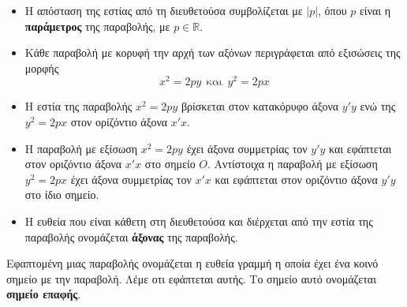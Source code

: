 \documentclass[twoside,nofonts,internet,shmeiwseis]{thewria}
\begin{document}
\begin{itemize}
\item Η απόσταση της εστίας από τη διευθετούσα συμβολίζεται με $ |p| $, όπου $ p $ είναι η \textbf{παράμετρος} της παραβολής, με $ p\in\mathbb{R} $.
\item Κάθε παραβολή με κορυφή την αρχή των αξόνων περιγράφεται από εξισώσεις της μορφής \[ x^2=2py\ \ \textrm{και}\ \  y^2=2px \]
\item Η εστία της παραβολής $ x^2=2py $ βρίσκεται στον κατακόρυφο άξονα $ y'y $ ενώ της $ y^2=2px $ στον ορίζόντιο άξονα $ x'x $.
\item Η παραβολή με εξίσωση $ x^2=2py $ έχει άξονα συμμετρίας τον $ y'y $ και εφάπτεται στον οριζόντιο άξονα $ x'x $ στο σημείο $ O $. Αντίστοιχα η παραβολή με εξίσωση $ y^2=2px $ έχει άξονα συμμετρίας τον $ x'x $ και εφάπτεται στον οριζόντιο άξονα $ y'y $ στο ίδιο σημείο.
\item Η ευθεία που είναι κάθετη στη διευθετούσα και διέρχεται από την εστία της παραβολής ονομάζεται \textbf{άξονας} της παραβολής.
\end{itemize}
Εφαπτομένη μιας παραβολής ονομάζεται η ευθεία γραμμή η οποία έχει ένα κοινό σημείο με την παραβολή. Λέμε οτι εφάπτεται αυτής. Το σημείο αυτό ονομάζεται \textbf{σημείο επαφής}.\\
\mbox{}\\\\\\
\end{document}

